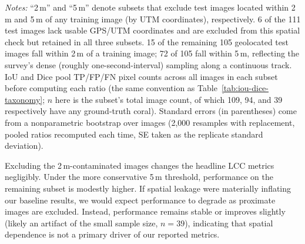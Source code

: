 \documentclass[11pt]{elsarticle}
\begin{document}
\begin{table}[htbp]
\centering
\caption{Live coral cover IoU, Dice, and pixel accuracy on the test set, with vs.\ without spatially-contaminated test images excluded.}
\label{tab:spatial-robustness}
\begin{tablenotes}
\item \emph{Notes:} ``2\,m'' and ``5\,m'' denote subsets that exclude test images located within 2\,m and 5\,m of any training image (by UTM coordinates), respectively. 6 of the 111 test images lack usable GPS/UTM coordinates and are excluded from this spatial check but retained in all three subsets. 15 of the remaining 105 geolocated test images fall within 2\,m of a training image; 72 of 105 fall within 5\,m, reflecting the survey's dense (roughly one-second-interval) sampling along a continuous track. IoU and Dice pool TP/FP/FN pixel counts across all images in each subset before computing each ratio (the same convention as Table~\ref{tab:iou-dice-taxonomy}; $n$ here is the subset's total image count, of which 109, 94, and 39 respectively have any ground-truth coral). Standard errors (in parentheses) come from a nonparametric bootstrap over images (2,000 resamples with replacement, pooled ratios recomputed each time, SE taken as the replicate standard deviation).
\end{tablenotes}
\end{table}

Excluding the 2\,m-contaminated images changes the headline LCC metrics negligibly. Under the more conservative 5\,m threshold, performance on the remaining subset is modestly higher. If spatial leakage were materially inflating our baseline results, we would expect performance to degrade as proximate images are excluded. Instead, performance remains stable or improves slightly (likely an artifact of the small sample size, $n=39$), indicating that spatial dependence is not a primary driver of our reported metrics.
\end{document}

